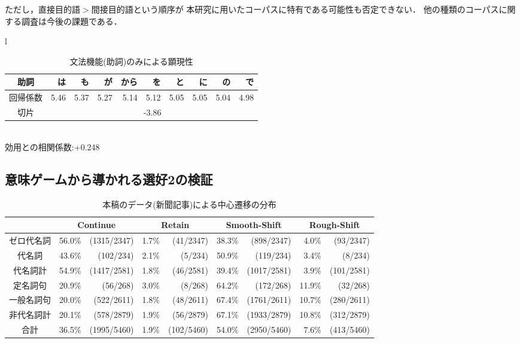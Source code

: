 ただし，直接目的語$>$間接目的語という順序が
本研究に用いたコーパスに特有である可能性も否定できない．
他の種類のコーパスに関する調査は今後の課題である．





\begin{table}
\begin{center}
\begin{tabular}{l}
\begin{tabular}{|c||r|r|r|r|r|r|r|r|r|}
\hline
助詞&は&も&が&から&を&と&に&の&で\\
\hline
回帰係数&5.46&5.37&5.27&5.14&5.12&5.05&5.05&5.04&4.98\\
\hline
切片&\multicolumn{9}{|c|}{-3.86}\\
\hline
\end{tabular}\\
効用との相関係数:+0.248\\
\end{tabular}
\end{center}
\caption{文法機能(助詞)のみによる顕現性}
\label{tab:only_gram}
\end{table}







\subsection{意味ゲームから導かれる選好2の検証}

\begin{table}
\begin{center}
\begin{tabular}{|c||rr|rr|rr|rr|}
\hline
&\multicolumn{2}{|c|}{Continue}&\multicolumn{2}{|c|}{Retain}&\multicolumn{2}{|c|}{Smooth-Shift}&\multicolumn{2}{|c|}{Rough-Shift}\\
\hline\hline
ゼロ代名詞&56.0\%&(1315/2347)&1.7\%&(41/2347)&38.3\%&(898/2347)&4.0\%&(93/2347)\\
代名詞&43.6\%&(102/234)&2.1\%&(5/234)&50.9\%&(119/234)&3.4\%&(8/234)\\
\hline
代名詞計&54.9\%&(1417/2581)&1.8\%&(46/2581)&39.4\%&(1017/2581)&3.9\%&(101/2581)\\
\hline\hline
定名詞句&20.9\%&(56/268)&3.0\%&(8/268)&64.2\%&(172/268)&11.9\%&(32/268)\\
一般名詞句&20.0\%&(522/2611)&1.8\%&(48/2611)&67.4\%&(1761/2611)&10.7\%&(280/2611)\\
\hline
非代名詞計&20.1\%&(578/2879)&1.9\%&(56/2879)&67.1\%&(1933/2879)&10.8\%&(312/2879)\\
\hline\hline
合計&36.5\%&(1995/5460)&1.9\%&(102/5460)&54.0\%&(2950/5460)&7.6\%&(413/5460)\\
\hline
\end{tabular}
\end{center}
\caption{本稿のデータ(新聞記事)による中心遷移の分布}
\label{tab:tran}

\end{table}



